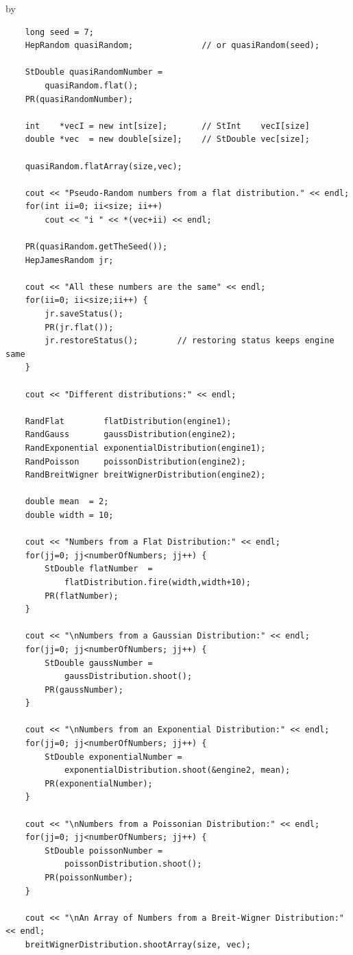 \documentclass[twoside]{article}
\newcommand{\entrylabel}[1]{\mbox{\textbf{{#1}}}\hfil}%
\newenvironment{entry}
{\begin{list}{}%
    {\renewcommand{\makelabel}{\entrylabel}%
     \setlength{\labelwidth}{90pt}%
     \setlength{\leftmargin}{\labelwidth}
     \advance\leftmargin by \labelsep%
      }%
    }%
  {\end{list}}
\newcommand{\Entrylabel}[1]%
{\raisebox{0pt}[1ex][0pt]{\makebox[\labelwidth][l]%
    {\parbox[t]{\labelwidth}{\hspace{0pt}\textbf{{#1}}}}}}
\newenvironment{Entry}%
{\renewcommand{\entrylabel}{\Entrylabel}\begin{entry}}%
  {\end{entry}}
\begin{document}
\begin{description}
\begin{Entry}
{\begin{verbatim}
    long seed = 7;
    HepRandom quasiRandom;              // or quasiRandom(seed);
    
    StDouble quasiRandomNumber =
        quasiRandom.flat();
    PR(quasiRandomNumber);

    int    *vecI = new int[size];       // StInt    vecI[size]
    double *vec  = new double[size];    // StDouble vec[size];
    
    quasiRandom.flatArray(size,vec);

    cout << "Pseudo-Random numbers from a flat distribution." << endl;
    for(int ii=0; ii<size; ii++)
        cout << "i " << *(vec+ii) << endl;
        
    PR(quasiRandom.getTheSeed());
    HepJamesRandom jr;

    cout << "All these numbers are the same" << endl;
    for(ii=0; ii<size;ii++) {
        jr.saveStatus();
        PR(jr.flat());
        jr.restoreStatus();        // restoring status keeps engine same
    }

    cout << "Different distributions:" << endl;

    RandFlat        flatDistribution(engine1);
    RandGauss       gaussDistribution(engine2);
    RandExponential exponentialDistribution(engine1);
    RandPoisson     poissonDistribution(engine2);
    RandBreitWigner breitWignerDistribution(engine2);

    double mean  = 2;
    double width = 10;

    cout << "Numbers from a Flat Distribution:" << endl;
    for(jj=0; jj<numberOfNumbers; jj++) {
        StDouble flatNumber  =
            flatDistribution.fire(width,width+10);
        PR(flatNumber);
    }

    cout << "\nNumbers from a Gaussian Distribution:" << endl;
    for(jj=0; jj<numberOfNumbers; jj++) {
        StDouble gaussNumber =
            gaussDistribution.shoot();
        PR(gaussNumber);
    }
        
    cout << "\nNumbers from an Exponential Distribution:" << endl;
    for(jj=0; jj<numberOfNumbers; jj++) {
        StDouble exponentialNumber =
            exponentialDistribution.shoot(&engine2, mean);
        PR(exponentialNumber);
    }

    cout << "\nNumbers from a Poissonian Distribution:" << endl;
    for(jj=0; jj<numberOfNumbers; jj++) {
        StDouble poissonNumber =
            poissonDistribution.shoot();
        PR(poissonNumber);
    }
    
    cout << "\nAn Array of Numbers from a Breit-Wigner Distribution:" << endl;
    breitWignerDistribution.shootArray(size, vec);


\end{verbatim}}
\end{Entry}
\end{description}
\end{document}
